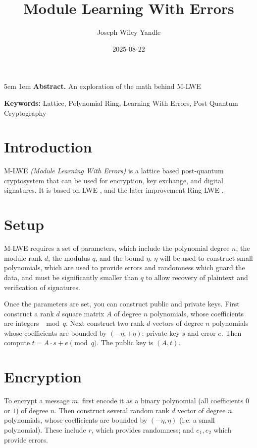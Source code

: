 \documentclass{article}
\title{Module Learning With Errors}
\date{2025-08-22}
\author{Joseph Wiley Yandle}
\begin{document}
\onecolumn
\maketitle

\begingroup
\leftskip5em
\parskip1em
\rightskip\leftskip
\noindent\textbf{Abstract.} An exploration of the math behind M-LWE

\par
\noindent\textbf{Keywords:} Lattice, Polynomial Ring, Learning With Errors, Post Quantum Cryptography
\par
\endgroup

\section{
  Introduction
}

M-LWE \emph{(Module Learning With Errors)} is a lattice based post-quantum cryptosystem that can be used for encryption, key exchange, and digital signatures.  It is based on LWE \cite{lwe}, and the later improvement Ring-LWE \cite{ringlwe}.

\section{
  Setup
}

M-LWE requires a set of parameters, which include the polynomial degree $n$, the module rank $d$, the modulus $q$, and the bound $\eta$.  $\eta$ will be used to construct small polynomials, which are used to provide errors and randomness which guard the data, and must be significantly smaller than $q$ to allow recovery of plaintext and verification of signatures.

Once the parameters are set, you can construct public and private keys.  First construct a rank $d$ square matrix $A$ of degree $n$ polynomials, whose coefficients are integers $\mod{q}$.  Next construct two rank $d$ vectors of degree $n$ polynomials whose coefficients are bounded by $(-\eta, +\eta)$: private key $s$ and error $e$.  Then compute $t = A \cdot s + e \pmod{q}$.  The public key is $(A, t)$.

\newpage
\section{
  Encryption
}

To encrypt a message $m$, first encode it as a binary polynomial (all coefficients $0$ or $1$) of degree $n$.  Then construct several random rank $d$ vector of degree $n$ polynomials, whose coefficients are bounded by $(-\eta, \eta)$ (i.e. a small polynomial).  These include $r$, which provides randomness; and $e_1, e_2$ which provide errors.
\end{document}
